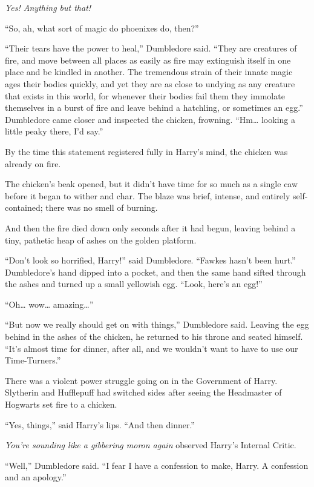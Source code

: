 \emph{Yes! Anything but that!}

``So, ah, what sort of magic do phoenixes do, then?''

``Their tears have the power to heal,'' Dumbledore said. ``They are
creatures of fire, and move between all places as easily as fire may
extinguish itself in one place and be kindled in another. The tremendous
strain of their innate magic ages their bodies quickly, and yet they are
as close to undying as any creature that exists in this world, for
whenever their bodies fail them they immolate themselves in a burst of
fire and leave behind a hatchling, or sometimes an egg.'' Dumbledore
came closer and inspected the chicken, frowning. ``Hm\ldots{} looking a
little peaky there, I'd say.''

By the time this statement registered fully in Harry's mind, the chicken
was already on fire.

The chicken's beak opened, but it didn't have time for so much as a
single caw before it began to wither and char. The blaze was brief,
intense, and entirely self-contained; there was no smell of burning.

And then the fire died down only seconds after it had begun, leaving
behind a tiny, pathetic heap of ashes on the golden platform.

``Don't look so horrified, Harry!'' said Dumbledore. ``Fawkes hasn't
been hurt.'' Dumbledore's hand dipped into a pocket, and then the same
hand sifted through the ashes and turned up a small yellowish egg.
``Look, here's an egg!''

``Oh\ldots{} wow\ldots{} amazing\ldots{}''

``But now we really should get on with things,'' Dumbledore said.
Leaving the egg behind in the ashes of the chicken, he returned to his
throne and seated himself. ``It's almost time for dinner, after all, and
we wouldn't want to have to use our Time-Turners.''

There was a violent power struggle going on in the Government of Harry.
Slytherin and Hufflepuff had switched sides after seeing the Headmaster
of Hogwarts set fire to a chicken.

``Yes, things,'' said Harry's lips. ``And then dinner.''

\emph{You're sounding like a gibbering moron again} observed Harry's
Internal Critic.

``Well,'' Dumbledore said. ``I fear I have a confession to make, Harry.
A confession and an apology.''

